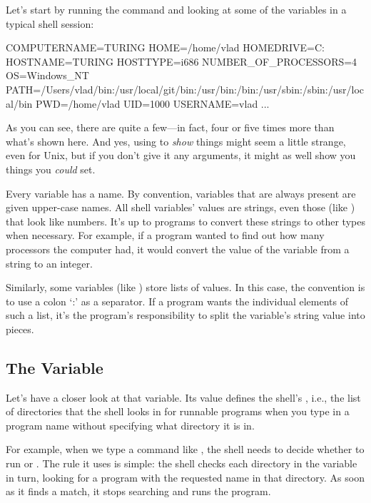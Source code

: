 Let's start by running the command  and looking at some of
the variables in a typical shell session:


\begin{VerbOut}
COMPUTERNAME=TURING
HOME=/home/vlad
HOMEDRIVE=C:
HOSTNAME=TURING
HOSTTYPE=i686
NUMBER_OF_PROCESSORS=4
OS=Windows_NT
PATH=/Users/vlad/bin:/usr/local/git/bin:/usr/bin:/bin:/usr/sbin:/sbin:/usr/local/bin
PWD=/home/vlad
UID=1000
USERNAME=vlad
...
\end{VerbOut}

As you can see, there are quite a few---in fact, four or five times more
than what's shown here. And yes, using  to \emph{show}
things might seem a little strange, even for Unix, but if you don't give
it any arguments, it might as well show you things you \emph{could} set.

Every variable has a name. By convention, variables that are always
present are given upper-case names. All shell variables' values are
strings, even those (like ) that look like numbers. It's up
to programs to convert these strings to other types when necessary. For
example, if a program wanted to find out how many processors the
computer had, it would convert the value of the
 variable from a string to an integer.

Similarly, some variables (like ) store lists of values. In
this case, the convention is to use a colon `:' as a separator. If a
program wants the individual elements of such a list, it's the program's
responsibility to split the variable's string value into pieces.

\subsection*{The  Variable}

Let's have a closer look at that  variable. Its value
defines the shell's , i.e., the
list of directories that the shell looks in for runnable programs when
you type in a program name without specifying what directory it is in.

For example, when we type a command like , the shell
needs to decide whether to run  or
. The rule it uses is simple: the shell checks each
directory in the  variable in turn, looking for a program
with the requested name in that directory. As soon as it finds a match,
it stops searching and runs the program.

